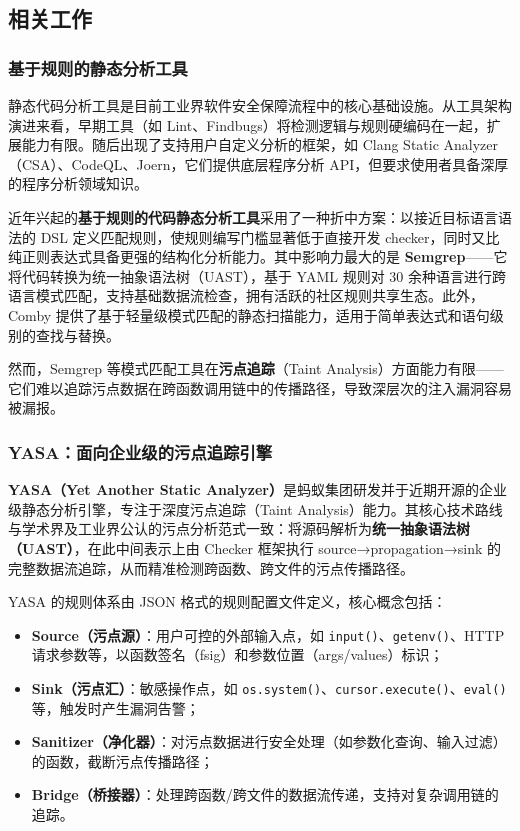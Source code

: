 \documentclass[a4paper,12pt,UTF8]{ctexart}
\numberwithin{figure}{section}
\numberwithin{table}{section}
\numberwithin{equation}{section}
\begin{document}
\subsection{相关工作}

{\songti

\subsubsection{基于规则的静态分析工具}

静态代码分析工具是目前工业界软件安全保障流程中的核心基础设施。从工具架构演进来看，早期工具（如 Lint、Findbugs）将检测逻辑与规则硬编码在一起，扩展能力有限。随后出现了支持用户自定义分析的框架，如 Clang Static Analyzer（CSA）、CodeQL、Joern，它们提供底层程序分析 API，但要求使用者具备深厚的程序分析领域知识\cite{hou2025}。

近年兴起的\textbf{基于规则的代码静态分析工具}采用了一种折中方案：以接近目标语言语法的 DSL 定义匹配规则，使规则编写门槛显著低于直接开发 checker，同时又比纯正则表达式具备更强的结构化分析能力。其中影响力最大的是 \textbf{Semgrep}——它将代码转换为统一抽象语法树（UAST），基于 YAML 规则对 30 余种语言进行跨语言模式匹配，支持基础数据流检查，拥有活跃的社区规则共享生态\cite{hou2025}。此外，Comby 提供了基于轻量级模式匹配的静态扫描能力，适用于简单表达式和语句级别的查找与替换。

然而，Semgrep 等模式匹配工具在\textbf{污点追踪}（Taint Analysis）方面能力有限——它们难以追踪污点数据在跨函数调用链中的传播路径，导致深层次的注入漏洞容易被漏报。

\subsubsection{YASA：面向企业级的污点追踪引擎}

\textbf{YASA（Yet Another Static Analyzer）}是蚂蚁集团研发并于近期开源的企业级静态分析引擎，专注于深度污点追踪（Taint Analysis）能力。其核心技术路线与学术界及工业界公认的污点分析范式一致：将源码解析为\textbf{统一抽象语法树（UAST）}，在此中间表示上由 Checker 框架执行 source→propagation→sink 的完整数据流追踪，从而精准检测跨函数、跨文件的污点传播路径。

YASA 的规则体系由 JSON 格式的规则配置文件定义，核心概念包括：
\begin{itemize}
  \item \textbf{Source（污点源）}：用户可控的外部输入点，如 \texttt{input()}、\texttt{getenv()}、HTTP 请求参数等，以函数签名（fsig）和参数位置（args/values）标识；
  \item \textbf{Sink（污点汇）}：敏感操作点，如 \texttt{os.system()}、\texttt{cursor.execute()}、\texttt{eval()} 等，触发时产生漏洞告警；
  \item \textbf{Sanitizer（净化器）}：对污点数据进行安全处理（如参数化查询、输入过滤）的函数，截断污点传播路径；
  \item \textbf{Bridge（桥接器）}：处理跨函数/跨文件的数据流传递，支持对复杂调用链的追踪。
\end{itemize}

}
\end{document}
